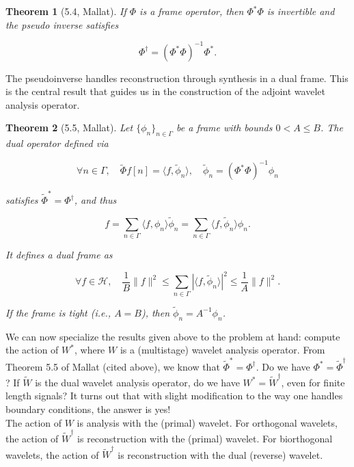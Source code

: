 \documentclass{article}
\theoremstyle{mystuff}
\newtheorem*{theorem*}{Theorem}
\theoremstyle{myexample}
\theoremstyle{named}
\begin{document}
\begin{theorem*}[5.4, Mallat]
   If $\Phi$ is a frame operator, then $\Phi^\ast\Phi$ is invertible and the pseudo inverse satisfies

   \[ \Phi^\dagger = (\Phi^\ast\Phi)^{-1}\Phi^\ast. \] 
\end{theorem*}

\noindent The pseudoinverse handles reconstruction through synthesis in a dual frame.  This is the central result that guides us in the construction of the adjoint wavelet analysis operator.

\begin{theorem*}[5.5, Mallat]
   Let $\{\phi_n\}_{n\in\Gamma}$ be a frame with bounds $0<A\le B$.  The dual operator defined via

   \[ \forall n\in \Gamma, \quad \widetilde{\Phi} f[n] = \langle f, \tilde{\phi}_n\rangle, \quad \tilde{\phi}_n = (\Phi^\ast\Phi)^{-1} \phi_n \] 

   \noindent satisfies $\widetilde{\Phi}^\ast = \Phi^\dagger$, and thus

   \[ f = \sum_{n\in\Gamma} \langle f, \phi_n\rangle \tilde{\phi}_n = \sum_{n\in\Gamma} \langle f, \tilde{\phi}_n\rangle \phi_n. \] 

   \noindent It defines a dual frame as

   \[ \forall f\in\mathcal{H}, \quad \frac{1}{B}\|f\|^2 \le \sum_{n\in\Gamma} |\langle f, \tilde{\phi}_n\rangle|^2 \le \dfrac{1}{A} \|f\|^2. \] 

   \noindent If the frame is tight (i.e., $A=B$), then $\tilde{\phi}_n=A^{-1}\phi_n$.
\end{theorem*}

We can now specialize the results given above to the problem at hand: compute the action of $W^\ast$, where $W$ is a (multistage) wavelet analysis operator.  From Theorem 5.5 of Mallat (cited above), we know that $\widetilde{\Phi}^\ast = \Phi^\dagger$.  Do we have $\Phi^\ast = \widetilde{\Phi}^\dagger$?  If $\widetilde{W}$ is the dual wavelet analysis operator, do we have $W^\ast = \widetilde{W}^\dagger$, even for finite length signals?  It turns out that with slight modification to the way one handles boundary conditions, the answer is yes!\\

The action of $W$ is analysis with the (primal) wavelet.  For orthogonal wavelets, the action of $\widetilde{W}^\dagger$ is reconstruction with the (primal) wavelet.  For biorthogonal wavelets, the action of $\widetilde{W}^\dagger$ is reconstruction with the dual (reverse) wavelet.\\
\end{document}
